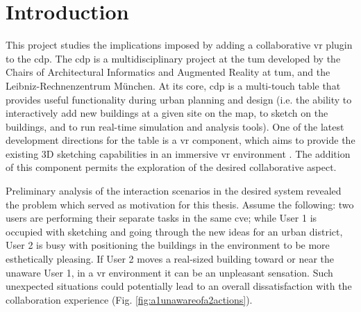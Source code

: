 
\chapter{Introduction}





This project studies the implications imposed by adding a collaborative \gls{vr} plugin to the \gls{cdp}.
The \gls{cdp} is a multidisciplinary project at the \gls{tum} developed by the Chairs of Architectural Informatics and Augmented Reality at \gls{tum}, and the Leibniz-Rechnenzentrum M{\"u}nchen.
At its core, \gls{cdp} is a multi-touch table that provides useful functionality during urban planning and design (i.e. the ability to interactively add new buildings at a given site on the map, to sketch on the buildings, and to run real-time simulation and analysis tools). One of the latest  development directions for the table is a \gls{vr} component, which aims to provide the existing 3D sketching capabilities in an immersive \gls{vr} environment \cite[p.~5]{lampe_cdp//vr-sketching_2017}. 
The addition of this component permits the exploration of the desired collaborative aspect.

Preliminary analysis of the interaction scenarios in the desired system revealed the problem which served as motivation for this thesis. Assume the following: two users are performing their separate tasks in the same \gls{cve}; while User 1 is occupied with sketching and going through the new ideas for an urban district, User 2 is busy with positioning the buildings in the environment to be more esthetically pleasing. If User 2 moves a real-sized building toward or near the unaware User 1, in a \gls{vr} environment it can be an unpleasant sensation. Such unexpected situations could potentially lead to an overall dissatisfaction with the collaboration experience (Fig. \ref{fig:a1unawareofa2actions}).

